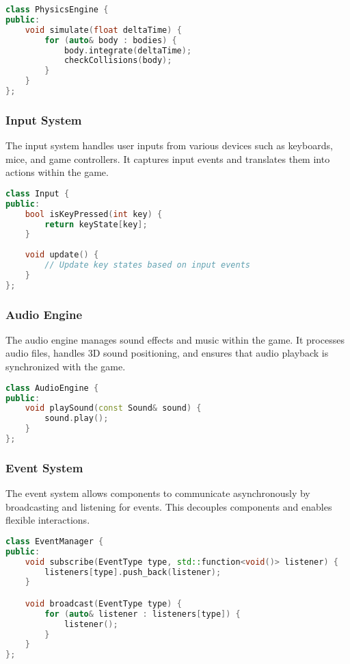 \begin{lstlisting}[caption={Physics Simulation}, language=C++]
class PhysicsEngine {
public:
    void simulate(float deltaTime) {
        for (auto& body : bodies) {
            body.integrate(deltaTime);
            checkCollisions(body);
        }
    }
};
\end{lstlisting}

\subsubsection*{Input System}

The input system handles user inputs from various devices such as keyboards, mice, and game controllers. It captures input events and translates them into actions within the game.

\begin{lstlisting}[caption={Input Handling}, language=C++]
class Input {
public:
    bool isKeyPressed(int key) {
        return keyState[key];
    }
    
    void update() {
        // Update key states based on input events
    }
};
\end{lstlisting}

\subsubsection*{Audio Engine}

The audio engine manages sound effects and music within the game. It processes audio files, handles 3D sound positioning, and ensures that audio playback is synchronized with the game.

\begin{lstlisting}[caption={Audio Playback}, language=C++]
class AudioEngine {
public:
    void playSound(const Sound& sound) {
        sound.play();
    }
};
\end{lstlisting}

\subsubsection*{Event System}

The event system allows components to communicate asynchronously by broadcasting and listening for events. This decouples components and enables flexible interactions.

\begin{lstlisting}[caption={Event System}, language=C++]
class EventManager {
public:
    void subscribe(EventType type, std::function<void()> listener) {
        listeners[type].push_back(listener);
    }

    void broadcast(EventType type) {
        for (auto& listener : listeners[type]) {
            listener();
        }
    }
};
\end{lstlisting}


